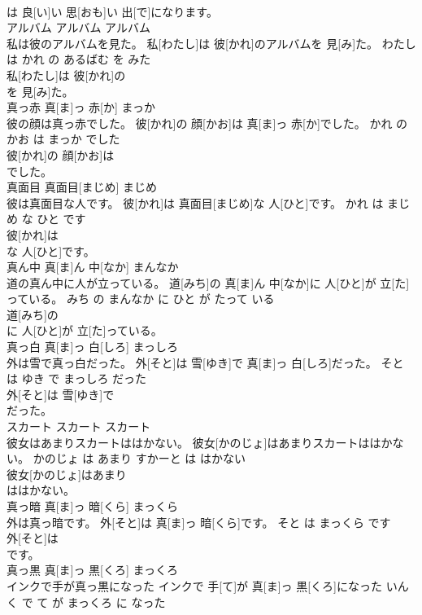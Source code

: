 \documentclass[8pt]{extreport}
\begin{document}
\begin{CJK}{UTF8}{min}
\\	は 良[い]い 思[おも]い 出[で]になります。			
\\	アルバム	アルバム	アルバム	
\\	私は彼のアルバムを見た。	私[わたし]は 彼[かれ]のアルバムを 見[み]た。	わたし は かれ の あるばむ を みた	
\\	私[わたし]は 彼[かれ]の
\\	を 見[み]た。			
\\	真っ赤	真[ま]っ 赤[か]	まっか	
\\	彼の顔は真っ赤でした。	彼[かれ]の 顔[かお]は 真[ま]っ 赤[か]でした。	かれ の かお は まっか でした	
\\	彼[かれ]の 顔[かお]は
\\	でした。			
\\	真面目	真面目[まじめ]	まじめ	
\\	彼は真面目な人です。	彼[かれ]は 真面目[まじめ]な 人[ひと]です。	かれ は まじめ な ひと です	
\\	彼[かれ]は
\\	な 人[ひと]です。			
\\	真ん中	真[ま]ん 中[なか]	まんなか	
\\	道の真ん中に人が立っている。	道[みち]の 真[ま]ん 中[なか]に 人[ひと]が 立[た]っている。	みち の まんなか に ひと が たって いる	
\\	道[みち]の
\\	に 人[ひと]が 立[た]っている。			
\\	真っ白	真[ま]っ 白[しろ]	まっしろ	
\\	外は雪で真っ白だった。	外[そと]は 雪[ゆき]で 真[ま]っ 白[しろ]だった。	そと は ゆき で まっしろ だった	
\\	外[そと]は 雪[ゆき]で
\\	だった。			
\\	スカート	スカート	スカート	
\\	彼女はあまりスカートははかない。	彼女[かのじょ]はあまりスカートははかない。	かのじょ は あまり すかーと は はかない	
\\	彼女[かのじょ]はあまり
\\	ははかない。			
\\	真っ暗	真[ま]っ 暗[くら]	まっくら	
\\	外は真っ暗です。	外[そと]は 真[ま]っ 暗[くら]です。	そと は まっくら です	
\\	外[そと]は
\\	です。			
\\	真っ黒	真[ま]っ 黒[くろ]	まっくろ	
\\	インクで手が真っ黒になった	インクで 手[て]が 真[ま]っ 黒[くろ]になった	いんく で て が まっくろ に なった	

\end{CJK}
\end{document}
